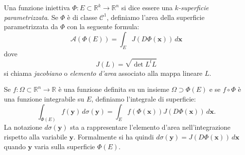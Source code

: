 \documentclass[italian,a4paper]{scrartcl}
\newcommand{\RR}{{\mathbb R}}
\newcommand{\defeq}{=}
\renewcommand{\vec}{\mathbf}
\begin{document}
\begin{definition}
Una funzione iniettiva $\Phi\colon E \subset \RR^k \to \RR^n$ si dice essere una
\emph{$k$-superficie parametrizzata}.
Se $\Phi$ è di classe $\mathcal C^1$,
definiamo l'area della superficie parametrizzata da $\Phi$ con la
seguente formula:
\[
\mathcal A(\Phi(E)) \defeq \int_E J(D\Phi(\vec x))\, d\vec x
\]
dove 
\[
  J(L) = \sqrt{\det L^t L}
\]
si chiama \emph{jacobiano} o \emph{elemento d'area} associato alla
mappa lineare $L$.

Se $f\colon\Omega\subset \RR^n \to \RR$ è una funzione definita su un insieme $\Omega\supset \Phi(E)$
e se $f\circ \Phi$ è una funzione integrabile su $E$, definiamo
l'integrale di superficie:
\[
  \int_{\Phi(E)} f(\vec y)\, d\sigma(\vec y)
 = \int_E f(\Phi(\vec x)) J(D\Phi(\vec x))\, d\vec x.
\]
La notazione $d\sigma(\vec y)$ sta a rappresentare l'elemento
d'area nell'integrazione rispetto alla variabile $\vec
y$. Formalmente si ha quindi $d\sigma(\vec y) = J(D\Phi(\vec
x))\, d\vec x$ quando $\vec y$ varia sulla superficie
$\Phi(E)$. 

\end{definition}
\end{document}
